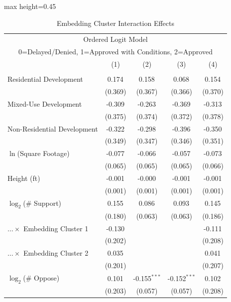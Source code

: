 \begin{table}[H]
\centering
\caption{Embedding Cluster Interaction Effects}
\vspace{0.2cm}
\label{tab_policy_imps}
\begin{adjustbox}{max height=0.45\textheight}
\begin{threeparttable}
\begin{tabular}{lcccc}
\multicolumn{5}{c}{Ordered Logit Model} \\
\multicolumn{5}{c}{0=Delayed/Denied, 1=Approved with Conditions, 2=Approved} \\
\toprule
 & (1) & (2) & (3) & (4) \\
\midrule
 &  &  &  &  \\
Residential Development  & 0.174$^{}$ & 0.158$^{}$ & 0.068$^{}$ & 0.154$^{}$ \\
 & (0.369) & (0.367) & (0.366) & (0.370) \\ [1.8ex]
Mixed-Use Development  & -0.309$^{}$ & -0.263$^{}$ & -0.369$^{}$ & -0.313$^{}$ \\
 & (0.375) & (0.374) & (0.372) & (0.378) \\ [1.8ex]
Non-Residential Development  & -0.322$^{}$ & -0.298$^{}$ & -0.396$^{}$ & -0.350$^{}$ \\
 & (0.349) & (0.347) & (0.346) & (0.351) \\ [1.8ex]
$\ln$(Square Footage)  & -0.077$^{}$ & -0.066$^{}$ & -0.057$^{}$ & -0.073$^{}$ \\
 & (0.065) & (0.065) & (0.065) & (0.066) \\ [1.8ex]
Height (ft)  & -0.001$^{}$ & -0.000$^{}$ & -0.001$^{}$ & -0.001$^{}$ \\
 & (0.001) & (0.001) & (0.001) & (0.001) \\ [1.8ex]
$\log_2$(\# Support)  & 0.155$^{}$ & 0.086$^{}$ & 0.093$^{}$ & 0.145$^{}$ \\
 & (0.180) & (0.063) & (0.063) & (0.186) \\ [1.8ex]
$\ldots \times$ Embedding Cluster 1  & -0.130$^{}$ &  &  & -0.111$^{}$ \\
 & (0.202) &  &  & (0.208) \\ [1.8ex]
$\ldots \times$ Embedding Cluster 2  & 0.035$^{}$ &  &  & 0.041$^{}$ \\
 & (0.201) &  &  & (0.207) \\ [1.8ex]
$\log_2$(\# Oppose)  & 0.101$^{}$ & -0.155$^{***}$ & -0.152$^{***}$ & 0.102$^{}$ \\
 & (0.203) & (0.057) & (0.057) & (0.208) \\ [1.8ex]

\end{tabular}
\end{threeparttable}
\end{adjustbox}
\end{table}
